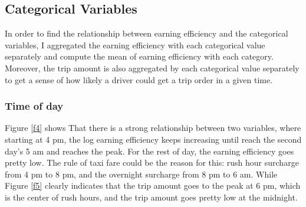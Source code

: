 \documentclass[11pt]{article}
\begin{document}
\subsection{Categorical Variables}
In order to find the relationship between earning efficiency and the categorical variables, I aggregated the earning efficiency with each categorical value separately and compute the mean of earning efficiency with each category. Moreover, the trip amount is also aggregated by each categorical value separately to get a sense of how likely a driver could get a trip order in a given time.
\subsubsection{Time of day}
Figure \ref{f4} shows That there is a strong relationship between two variables, where starting at 4 pm, the log earning efficiency keeps increasing until reach the second day's 5 am and reaches the peak. For the rest of day, the earning efficiency goes pretty low. The rule of taxi fare could be the reason for this: rush hour surcharge from 4 pm to 8 pm, and the overnight surcharge from 8 pm to 6 am. While Figure \ref{f5} clearly indicates that the trip amount goes to the peak at 6 pm, which is the center of rush hours, and the trip amount goes pretty low at the midnight.
\end{document}
